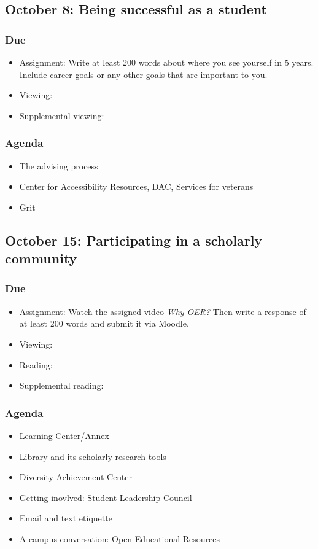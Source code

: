\documentclass[12pt,article,oneside]{memoir}
\begin{document}
\subsection{October 8: Being successful as a student}
\subsubsection{Due}
\begin{itemize}
 \item Assignment: Write at least 200 words about where you see yourself in 5 years.  Include career goals or any other goals that are important to you.
 \item Viewing: \cite{decipher}
 \item Supplemental viewing: \cite{tannahill} 
\end{itemize}

\subsubsection{Agenda}
\begin{itemize}
\item The advising process
\item Center for Accessibility Resources, DAC, Services for veterans
\item Grit

\end{itemize} 



\subsection{October 15: Participating in a scholarly community}
\subsubsection{Due}
\begin{itemize}
 \item Assignment: Watch the assigned video \emph{Why OER?}  Then write a response of at least 200 words and submit it via Moodle. 
 \item Viewing: \cite{oer}
 \item Reading: \cite{wellsley}
 \item Supplemental reading: \cite{oer-dh}
\end{itemize}


\subsubsection{Agenda}
\begin{itemize}
 \item Learning Center/Annex
 \item Library and its scholarly research tools
 \item Diversity Achievement Center
 \item Getting inovlved: Student Leadership Council
 \item Email and text etiquette
 \item A campus conversation: Open Educational Resources
\end{itemize}
\end{document}
